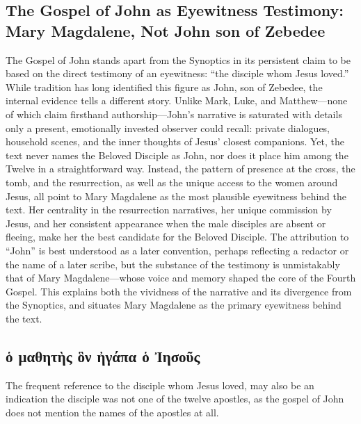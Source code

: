 \subsection{The Gospel of John as Eyewitness Testimony: Mary Magdalene, Not John son of Zebedee}\label{subsec:the-gospel-of-john-is-widely-accepted-to-be-one-gospel-that-indicates-it-was-written-by-an-eyewitness.}

The Gospel of John stands apart from the Synoptics in its persistent claim to be based on the direct testimony of an eyewitness: “the disciple whom Jesus loved.” While tradition has long identified this figure as John, son of Zebedee, the internal evidence tells a different story. Unlike Mark, Luke, and Matthew—none of which claim firsthand authorship—John’s narrative is saturated with details only a present, emotionally invested observer could recall: private dialogues, household scenes, and the inner thoughts of Jesus’ closest companions. Yet, the text never names the Beloved Disciple as John, nor does it place him among the Twelve in a straightforward way. Instead, the pattern of presence at the cross, the tomb, and the resurrection, as well as the unique access to the women around Jesus, all point to Mary Magdalene as the most plausible eyewitness behind the text. Her centrality in the resurrection narratives, her unique commission by Jesus, and her consistent appearance when the male disciples are absent or fleeing, make her the best candidate for the Beloved Disciple. The attribution to “John” is best understood as a later convention, perhaps reflecting a redactor or the name of a later scribe, but the substance of the testimony is unmistakably that of Mary Magdalene—whose voice and memory shaped the core of the Fourth Gospel. This explains both the vividness of the narrative and its divergence from the Synoptics, and situates Mary Magdalene as the primary eyewitness behind the text.

\subsection{ὁ μαθητὴς ὃν ἠγάπα ὁ Ἰησοῦς}\label{subsec:ux1f41-ux3bcux3b1ux3b8ux3b7ux3c4ux1f74ux3c2-ux1f43ux3bd-ux1f20ux3b3ux3acux3c0ux3b1-ux1f41-ux1f30ux3b7ux3c3ux3bfux1fe6ux3c2}

The frequent reference to the disciple whom Jesus loved, may also be an indication the disciple was not one of the twelve apostles, as the gospel of John does not mention the names of the apostles at all.

